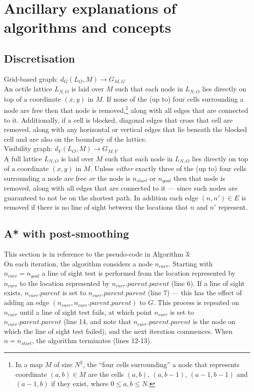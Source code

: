 \appendix

\chapter{Ancillary explanations of algorithms and concepts}

\section{Discretisation}
Grid-based graph: $d_{G}(L_{O},M) \rightarrow G_{M,G}$\\
\noindent
An octile lattice $L_{N,O}$ is laid over $M$ such that each node in $L_{N,O}$ lies directly on top of a coordinate $(x,y)$ in $M$. If none of the (up to) four cells surrounding a node are free then that node is removed,\footnote{In a map $M$ of size $N^{2}$, the ``four cells surrounding'' a node that represents coordinate $(a,b) \in M$ are the cells $(a,b)$, $(a,b-1)$, $(a-1,b-1)$ and $(a-1,b)$ if they exist, where $0 \leq a,b \leq N$.} along with all edges that are connected to it. Additionally, if a cell is blocked, diagonal edges that cross that cell are removed, along with any horizontal or vertical edges that lie beneath the blocked cell and are also on the boundary of the lattice.\\

\noindent
Visibility graph: $d_{V}(L_{O},M) \rightarrow G_{M,V}$\\
\noindent
A full lattice $L_{N,O}$ is laid over $M$ such that each node in $L_{N,O}$ lies directly on top of a coordinate $(x,y)$ in $M$. Unless {\em either} exactly three of the (up to) four cells surrounding a node are free {\em or} the node is $n_{start}$ or $n_{goal}$ then that node is removed, along with all edges that are connected to it --- since such nodes are guaranteed to not be on the shortest path. In addition each edge $(n,n') \in E$ is removed if there is no line of sight between the locations that $n$ and $n'$ represent.\\

\section{A* with post-smoothing}
This section is in reference to the pseudo-code in Algorithm 3:\\

\noindent On each iteration, the algorithm considers a node $n_{curr}$. Starting with $n_{curr} = n_{goal}$ a line of sight test is performed from the location represented by $n_{curr}$ to the location represented by $n_{curr}.parent.parent$ (line 6). If a line of sight exists, $n_{curr}.parent$ is set to $n_{curr}.parent.parent$ (line 7) --- this has the effect of adding an edge $(n_{curr},n_{curr}.parent.parent)$ to $G$. This process is repeated on $n_{curr}$ until a line of sight test fails, at which point $n_{curr}$ is set to $n_{curr}.parent.parent$ (line 14, and note that $n_{curr}.parent.parent$ is the node on which the line of sight test failed), and the next iteration commences. When $n = n_{start}$, the algorithm terminates (lines 12-13).\\

